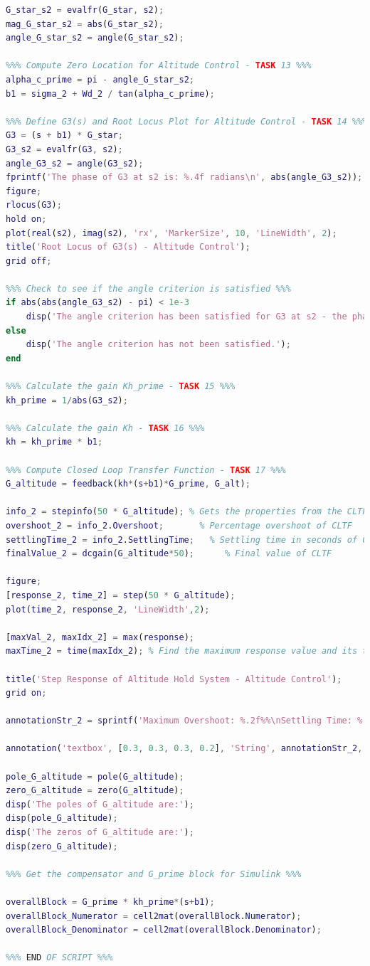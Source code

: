 \documentclass[stu, a4paper, 12pt, floatsintext]{apa7}
\numberwithin{figure}{section}
\numberwithin{table}{section}
\numberwithin{equation}{section}
\begin{document}
\begin{lstlisting}[language=MATLAB]
%%% Evaluating the Complex Number of G_star - TASK 12 %%%
G_star_s2 = evalfr(G_star, s2);
mag_G_star_s2 = abs(G_star_s2);
angle_G_star_s2 = angle(G_star_s2);

%%% Compute Zero Location for Altitude Control - TASK 13 %%%
alpha_c_prime = pi - angle_G_star_s2;
b1 = sigma_2 + Wd_2 / tan(alpha_c_prime);

%%% Define G3(s) and Root Locus Plot for Altitude Control - TASK 14 %%%
G3 = (s + b1) * G_star;
G3_s2 = evalfr(G3, s2);
angle_G3_s2 = angle(G3_s2);
fprintf('The phase of G3 at s2 is: %.4f radians\n', abs(angle_G3_s2));
figure;
rlocus(G3);
hold on;
plot(real(s2), imag(s2), 'rx', 'MarkerSize', 10, 'LineWidth', 2);
title('Root Locus of G3(s) - Altitude Control');
grid off;

%%% Check to see if the angle criterion is satisfied %%%
if abs(abs(angle_G3_s2) - pi) < 1e-3
    disp('The angle criterion has been satisfied for G3 at s2 - the phase is approximately pi.');
else
    disp('The angle criterion has not been satisfied.');
end

%%% Calculate the gain Kh_prime - TASK 15 %%%
kh_prime = 1/abs(G3_s2);

%%% Calculate the gain Kh - TASK 16 %%%
kh = kh_prime * b1;

%%% Compute Closed Loop Transfer Function - TASK 17 %%%
G_altitude = feedback(kh*(s+b1)*G_prime, G_alt);

info_2 = stepinfo(50 * G_altitude); % Gets the properties from the CLTF with a step change of 5 degrees.
overshoot_2 = info_2.Overshoot;       % Percentage overshoot of CLTF
settlingTime_2 = info_2.SettlingTime;   % Settling time in seconds of CLTF
finalValue_2 = dcgain(G_altitude*50);      % Final value of CLTF

figure;
[response_2, time_2] = step(50 * G_altitude);
plot(time_2, response_2, 'LineWidth',2);

[maxVal_2, maxIdx_2] = max(response); 
maxTime_2 = time(maxIdx_2); % Find the maximum response value and its time

title('Step Response of Altitude Hold System - Altitude Control');
grid on;

annotationStr_2 = sprintf('Maximum Overshoot: %.2f%%\nSettling Time: %.2f s\nFinal Value: %.2f', overshoot_2, settlingTime_2, finalValue_2); % Creates the annotation text with variable placeholders.

annotation('textbox', [0.3, 0.3, 0.3, 0.2], 'String', annotationStr_2, 'FitBoxToText', 'on', 'BackgroundColor', '#ADD8E6', 'EdgeColor', 'black', 'FontSize', 50); % Creates the annotation with a text box.

pole_G_altitude = pole(G_altitude);
zero_G_altitude = zero(G_altitude);
disp('The poles of G_altitude are:');
disp(pole_G_altitude);
disp('The zeros of G_altitude are:');
disp(zero_G_altitude);

%%% Get the compensator and G_prime block for Simulink %%%

overallBlock = G_prime * kh_prime*(s+b1);
overallBlock_Numerator = cell2mat(overallBlock.Numerator);
overallBlock_Denominator = cell2mat(overallBlock.Denominator);

%%% END OF SCRIPT %%%
\end{lstlisting}
\end{document}
